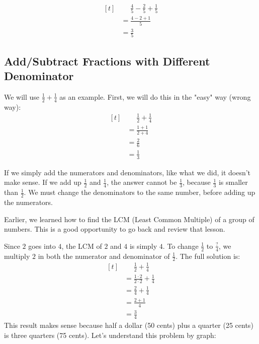 \begin{myexample}
\[ 
\begin{aligned}[t]
	&\phantom{{}=}\frac{4}{5}-\frac{2}{5}+\frac{1}{5} \\
	&= \frac{4-2+1}{5} \\
	&= \frac{3}{5}
\end{aligned}
\]
\end{myexample}

\subsection{Add/Subtract Fractions with Different Denominator}
We will use $\frac{1}{2}+\frac{1}{4}$ as an example. First, we will do this in the "easy" way (wrong way):
\[ 
\begin{aligned}[t]
	&\phantom{{}=}\frac{1}{2}+\frac{1}{4} \\
	&=\frac{1+1}{2+4} \\
	&=\frac{2}{6} \\
	&=\frac{1}{3} 
\end{aligned}
\]

If we simply add the numerators and denominators, like what we did, it doesn't make sense. If we add up $\frac{1}{2}$ and $\frac{1}{4}$, the answer cannot be $\frac{1}{3}$, because $\frac{1}{3}$ is smaller than $\frac{1}{2}$. We must change the denominators to the same number, before adding up the numerators.

Earlier, we learned how to find the LCM (Least Common Multiple) of a group of numbers. This is a good opportunity to go back and review that lesson.

Since $2$ goes into $4$, the LCM of $2$ and $4$ is simply $4$. To change $\frac{1}{2}$ to $\frac{?}{4}$, we multiply $2$ in both the numerator and denominator of $\frac{1}{2}$. The full solution is:
\[ 
\begin{aligned}[t]
	&\phantom{{}=}\frac{1}{2}+\frac{1}{4} \\
	&=\frac{1\cdot2}{2\cdot2}+\frac{1}{4} \\
	&=\frac{2}{4}+\frac{1}{4} \\
	&=\frac{2+1}{4} \\
	&=\frac{3}{4} 
\end{aligned}
\]
This result makes sense because half a dollar (50 cents) plus a quarter (25 cents) is three quarters (75 cents). Let's understand this problem by graph:

